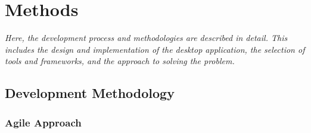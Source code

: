 \chapter{Methods}
\label{chp:methods}







\begin{center}
    \textit{Here, the development process and methodologies are described in detail. This includes the design and implementation of the desktop application, the selection of tools and frameworks, and the approach to solving the problem.}
\end{center}

\section{Development Methodology}
\label{sec:development-methodology}

\subsection{Agile Approach}
\label{subsec:agile-approach}

